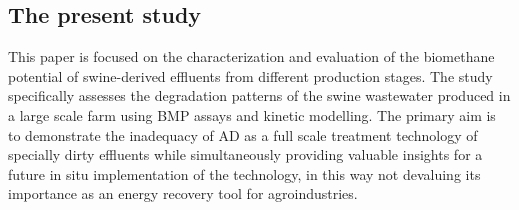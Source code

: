 \subsection{The present study}
This paper is focused on the characterization and evaluation of the biomethane potential of swine-derived effluents from different production stages. The study specifically assesses the degradation patterns of the swine wastewater produced in a large scale farm using BMP assays and kinetic modelling. The primary aim is to demonstrate the inadequacy of AD as a full scale treatment technology of specially dirty effluents while simultaneously providing valuable insights for a future in situ implementation of the technology, in this way not devaluing its importance as an energy recovery tool for agroindustries.
